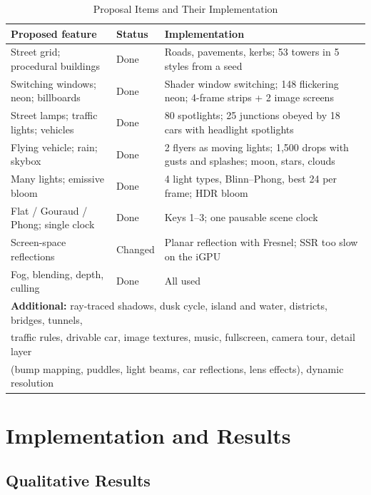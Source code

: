 \documentclass[12pt, a4paper]{report}
\begin{document}
\begin{table}[!htbp]
  \caption{Proposal Items and Their Implementation}
  \label{tab:4.1}
  \centering
  {\fontsize{10}{12.5}\selectfont
    \begin{tabular}{|p{1.75in}|p{0.75in}|p{2.9in}|}
      \hline
      \textbf{Proposed feature} & \textbf{Status} & \textbf{Implementation} \\
      \hline
      Street grid; procedural buildings & Done & Roads, pavements, kerbs; 53 towers in 5 styles from a seed \\
      \hline
      Switching windows; neon; billboards & Done & Shader window switching; 148 flickering neon; 4-frame strips + 2 image screens \\
      \hline
      Street lamps; traffic lights; vehicles & Done & 80 spotlights; 25 junctions obeyed by 18 cars with headlight spotlights \\
      \hline
      Flying vehicle; rain; skybox & Done & 2 flyers as moving lights; 1,500 drops with gusts and splashes; moon, stars, clouds \\
      \hline
      Many lights; emissive bloom & Done & 4 light types, Blinn--Phong, best 24 per frame; HDR bloom \\
      \hline
      Flat / Gouraud / Phong; single clock & Done & Keys 1--3; one pausable scene clock \\
      \hline
      Screen-space reflections & Changed & Planar reflection with Fresnel; SSR too slow on the iGPU \\
      \hline
      Fog, blending, depth, culling & Done & All used \\
      \hline
      \multicolumn{3}{|l|}{\textbf{Additional:} ray-traced shadows, dusk cycle, island and water, districts, bridges, tunnels,} \\
      \multicolumn{3}{|l|}{traffic rules, drivable car, image textures, music, fullscreen, camera tour, detail layer} \\
      \multicolumn{3}{|l|}{(bump mapping, puddles, light beams, car reflections, lens effects), dynamic resolution} \\
      \hline
    \end{tabular}
  }
\end{table}

\section{Implementation and Results}

\subsection{Qualitative Results}
\end{document}

